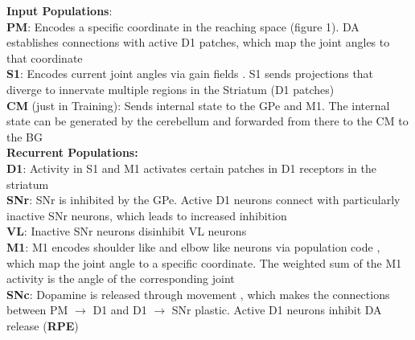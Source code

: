\textbf{\textcolor{training-set}{Input Populations}}:\\[2pt]
\footnotesize
\textbf{PM}: Encodes a specific coordinate in the reaching space (figure 1). DA establishes connections with active D1 patches, which map the joint angles to that coordinate\\[2pt]
\textbf{S1}: Encodes current joint angles via gain fields \parencite{pougetComputationalApproachesSensorimotor2000}. S1 sends projections that diverge to innervate multiple regions in the Striatum (D1 patches) \parencite{flahertyCorticostriatalTransformationsPrimate1991}\\[2pt]
\textbf{CM} (just in Training): Sends internal state to the GPe and M1. The internal state can be generated by the cerebellum \parencite{sendhilnathanCerebrocerebellarNetworkLearning2024} and forwarded from there to the CM to the BG\\[10pt]
\small
\textbf{Recurrent Populations:}\\[2pt]
\footnotesize
\textbf{D1}: Activity in S1 and M1 activates certain patches in D1 receptors in the striatum\\[2pt]
\textbf{SNr}: SNr is inhibited by the GPe. Active D1 neurons connect with particularly inactive SNr neurons, which leads to increased inhibition\\[2pt]
\textbf{VL}: Inactive SNr neurons disinhibit VL neurons\\[2pt]
\textbf{M1}: M1 encodes shoulder like and elbow like neurons via population code 
\parencite{pruszynskiPrimaryMotorCortex2011}, which map the joint angle to a specific coordinate. The weighted sum of the M1 activity is the angle of the corresponding joint\\[2pt]
\textbf{SNc}: Dopamine is released through movement \parencite{cheungLearningCriticallyDrives2023}, which makes the connections between PM $\rightarrow$ D1 and D1 $\rightarrow$ SNr plastic. Active D1 neurons inhibit DA release (\textbf{RPE})
